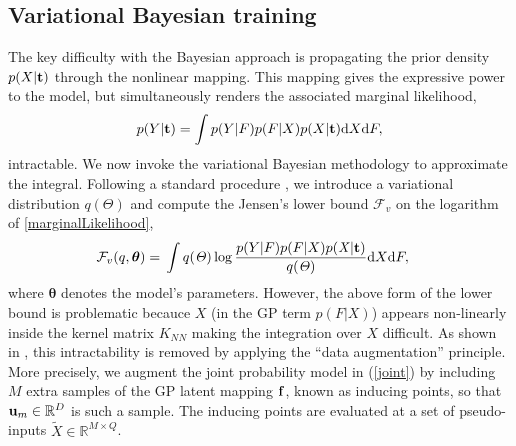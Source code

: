 \documentclass{article} %
\begin{document}
\subsection{Variational Bayesian training} 

The key difficulty with the Bayesian approach is propagating the prior
density $p(X|\mathbf{t})$ through the nonlinear mapping. This
mapping gives the expressive power to the model, but simultaneously
renders the associated marginal
likelihood,
\begin{equation}
\label{marginalLikelihood}
p(Y | \mathbf{t}) =  \int p( Y | F) p(F | X ) p(X | \mathbf{t}) \text{d}  X \text{d} F,
\end{equation}
intractable. We now invoke the variational Bayesian methodology to
approximate the integral. Following a standard procedure
\cite{bishop}, we introduce a variational distribution $q(\Theta)$ and
compute the Jensen's lower bound $\mathcal{F}_v$ on the logarithm of
\eqref{marginalLikelihood},
%
\begin{align}
\mathcal{F}_v(q, \boldsymbol \theta) = {}& \int q(\mathit{\Theta}) \log 
		\frac{ p(Y | F) p(F | X ) p(\mathit{X} | \mathbf{t})}
			 {q(\mathit{\Theta})}  \text{d}  X \text{d} F,
		 \label{jensens1}
\end{align}
%
%
where $\boldsymbol \theta$ denotes the model's parameters.  However,
the above form of the lower bound is problematic becauce $X$ (in the
GP term $p(F|X)$) appears non-linearly inside the kernel matrix
$K_{NN}$ making the integration over $X$ difficult. As shown in
\cite{BayesianGPLVM}, this intractability is removed by applying the
``data augmentation'' principle.  More precisely, we augment the joint
probability model in (\ref{joint}) by including $M$ extra samples of
the GP latent mapping $\mathbf{f}$, known as inducing points, so that
$\mathbf{u}_m \in \mathbb{R}^D$ is such a sample. The inducing points are
evaluated at a set of pseudo-inputs $\tilde{X} \in \mathbb{R}^{M
  \times Q}$. %
\end{document}
